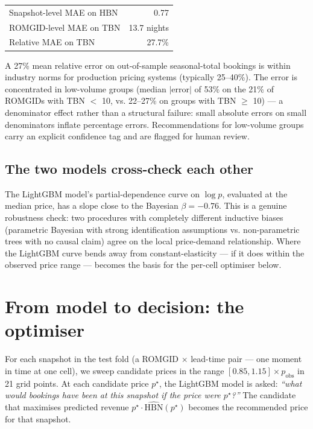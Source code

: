 \documentclass[11pt,a4paper]{article}
\begin{document}
\begin{center}
\small
\begin{tabular}{@{}lr@{}}
\toprule
Snapshot-level MAE on $\mathrm{HBN}$ & 0.77 \\
ROMGID-level MAE on TBN & 13.7 nights \\
Relative MAE on TBN  & 27.7\% \\
\bottomrule
\end{tabular}
\end{center}

\noindent A 27\% mean relative error on out-of-sample seasonal-total bookings is within industry norms for production pricing systems (typically 25--40\%). The error is concentrated in low-volume groups (median $|\text{error}|$ of 53\% on the 21\% of ROMGIDs with TBN $<$ 10, vs. 22--27\% on groups with TBN $\ge$ 10) --- a denominator effect rather than a structural failure: small absolute errors on small denominators inflate percentage errors. Recommendations for low-volume groups carry an explicit confidence tag and are flagged for human review.

\subsection{The two models cross-check each other}

The LightGBM model's partial-dependence curve on $\log p$, evaluated at the median price, has a slope close to the Bayesian $\beta = -0.76$. This is a genuine robustness check: two procedures with completely different inductive biases (parametric Bayesian with strong identification assumptions vs. non-parametric trees with no causal claim) agree on the local price-demand relationship. Where the LightGBM curve bends away from constant-elasticity --- if it does within the observed price range --- becomes the basis for the per-cell optimiser below.

\section{From model to decision: the optimiser}

For each snapshot in the test fold (a ROMGID $\times$ lead-time pair --- one moment in time at one cell), we sweep candidate prices in the range $[0.85, 1.15] \times p_{\text{obs}}$ in 21 grid points. At each candidate price $p^\star$, the LightGBM model is asked: \emph{``what would bookings have been at this snapshot if the price were $p^\star$?''} The candidate that maximises predicted revenue $p^\star \cdot \hat{\mathrm{HBN}}(p^\star)$ becomes the recommended price for that snapshot.
\end{document}
